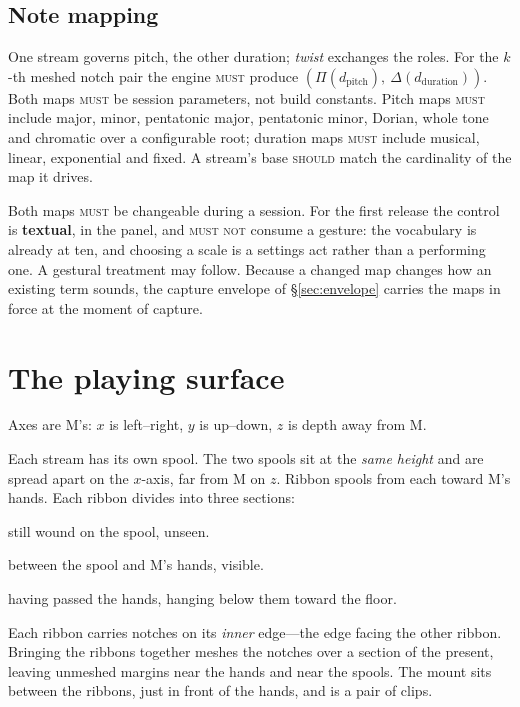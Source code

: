 \documentclass[11pt,a4paper]{article}
\newcommand{\MUST}{\textsc{must}}
\newcommand{\MUSTNOT}{\textsc{must not}}
\newcommand{\SHOULD}{\textsc{should}}
\theoremstyle{definition}
\theoremstyle{plain}
\theoremstyle{remark}
\begin{document}
\subsection{Note mapping}

\label{sec:maps}
One stream governs pitch, the other duration; \emph{twist} exchanges the roles. For the $k$-th
meshed notch pair the engine \MUST{} produce
$(\Pi(d_{\text{pitch}}),\ \Delta(d_{\text{duration}}))$. Both maps \MUST{} be session parameters,
not build constants. Pitch maps \MUST{} include major, minor, pentatonic major, pentatonic minor,
Dorian, whole tone and chromatic over a configurable root; duration maps \MUST{} include musical,
linear, exponential and fixed. A stream's base \SHOULD{} match the cardinality of the map it drives.

Both maps \MUST{} be changeable during a session. For the first release the control is
\textbf{textual}, in the panel, and \MUSTNOT{} consume a gesture: the vocabulary is already at
ten, and choosing a scale is a settings act rather than a performing one. A gestural treatment may
follow. Because a changed map changes how an existing term sounds, the capture envelope of
\S\ref{sec:envelope} carries the maps in force at the moment of capture.

\section{The playing surface}
\label{sec:surface}

Axes are M's: $x$ is left--right, $y$ is up--down, $z$ is depth away from M.

Each stream has its own spool. The two spools sit at the \emph{same height} and are spread apart on
the $x$-axis, far from M on $z$. Ribbon spools from each toward M's hands. Each ribbon divides into
three sections:

\begin{description}[leftmargin=1.6cm,style=nextline]
\item[\textbf{Future}] still wound on the spool, unseen.
\item[\textbf{Present}] between the spool and M's hands, visible.
\item[\textbf{Past}] having passed the hands, hanging below them toward the floor.
\end{description}

Each ribbon carries notches on its \emph{inner} edge---the edge facing the other ribbon. Bringing
the ribbons together meshes the notches over a section of the present, leaving unmeshed margins
near the hands and near the spools. The mount sits between the ribbons, just in front of the hands,
and is a pair of clips.
\end{document}
